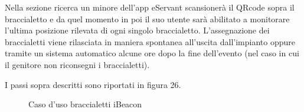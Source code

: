 Nella sezione ricerca un minore dell'app eServant scansionerà il QRcode sopra il braccialetto e da quel momento
in poi il suo utente sarà abilitato a monitorare l'ultima posizione rilevata di ogni singolo braccialetto.
L'assegnazione dei braccialetti viene rilasciata in maniera spontanea all'uscita dall'impianto oppure 
tramite un sistema automatico alcune ore dopo la fine dell'evento (nel caso in cui il genitore non riconsegni
i braccialetti).

I passi sopra descritti sono riportati in figura 26.
\begin{figure}[htp]
    \centering  
    \caption{Caso d'uso braccialetti iBeacon}

\end{figure}
